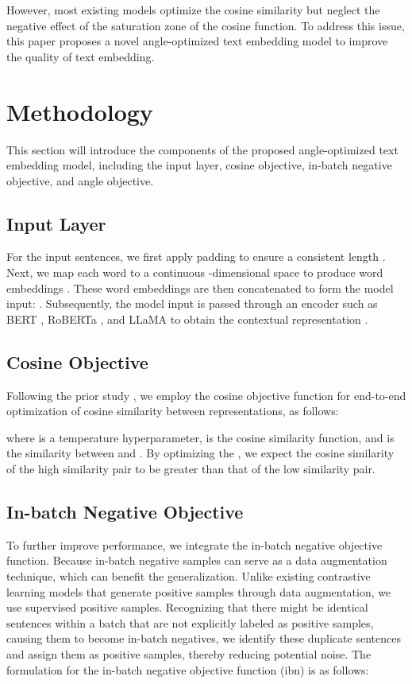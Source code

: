 \documentclass{article} \usepackage{iclr2024_conference,times}
\begin{document}
However, most existing models optimize the cosine similarity but neglect the negative effect of the saturation zone of the cosine function. To address this issue, this paper proposes a novel angle-optimized text embedding model to improve the quality of text embedding.

\section{Methodology}
This section will introduce the components of the proposed angle-optimized text embedding model, including the input layer, cosine objective, in-batch negative objective, and angle objective.

\subsection{Input Layer}
For the input sentences, we first apply padding to ensure a consistent length . Next, we map each word to a continuous -dimensional space to produce word embeddings . These word embeddings are then concatenated to form the model input: . Subsequently, the model input is passed through an encoder such as BERT \citep{DevlinCLT19BERT}, RoBERTa \citep{roberta-liu-2019}, and LLaMA \citep{touvron2023llama, touvron2023llama2}  to obtain the contextual representation .

\subsection{Cosine Objective}
Following the prior study \citep{cosent_su_2022}, we employ the cosine objective function for end-to-end optimization of cosine similarity between representations, as follows:

where  is a temperature hyperparameter,  is the cosine similarity function, and  is the similarity between  and . By optimizing the , we expect the cosine similarity of the high similarity pair to be greater than that of the low similarity pair.

\subsection{In-batch Negative Objective}
To further improve performance, we integrate the in-batch negative objective function. Because in-batch negative samples can serve as a data augmentation technique, which can benefit the generalization. Unlike existing contrastive learning models \citep{simcse_gao_2021,consert_yan_2021} that generate positive samples through data augmentation, we use supervised positive samples. Recognizing that there might be identical sentences within a batch that are not explicitly labeled as positive samples, causing them to become in-batch negatives, we identify these duplicate sentences and assign them as positive samples, thereby reducing potential noise. 
The formulation for the in-batch negative objective function (ibn) is as follows:
\end{document}
